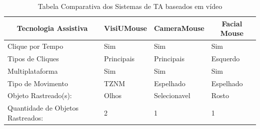 \begin{table}[H]
\centering
\caption{Tabela Comparativa dos Sistemas de TA baseados em vídeo}
\label{tabela-comparativa}
\begin{tabular}{|l|l|l|l|}
\hline
\multicolumn{1}{|c|}{\textbf{Tecnologia Assistiva}} & \multicolumn{1}{c|}{\textbf{VisiUMouse}} & \multicolumn{1}{c|}{\textbf{CameraMouse}} & \multicolumn{1}{c|}{\textbf{Facial Mouse}} \\ \hline
Clique por Tempo                                     & \cellcolor[HTML]{67FD9A}Sim              & \cellcolor[HTML]{67FD9A}Sim                & \cellcolor[HTML]{67FD9A}Sim                \\ \hline
Tipos  de Cliques                                    & Principais                               & Principais                                 & Esquerdo                                   \\ \hline
Multiplataforma                                     & \cellcolor[HTML]{67FD9A}Sim              & \cellcolor[HTML]{67FD9A}Sim                & \cellcolor[HTML]{67FD9A}Sim                \\ \hline
Tipo de Movimento                                   & TZNM                                     & Espelhado                                  & Espelhado                                  \\ \hline
Objeto Rastreado(s):                                & Olhos                                    & Selecionavel                               & Rosto                                      \\ \hline
Quantidade de Objetos Rastreados:                   & 2                                        & 1                                          & 1                                          \\ \hline
\end{tabular}
\end{table}


